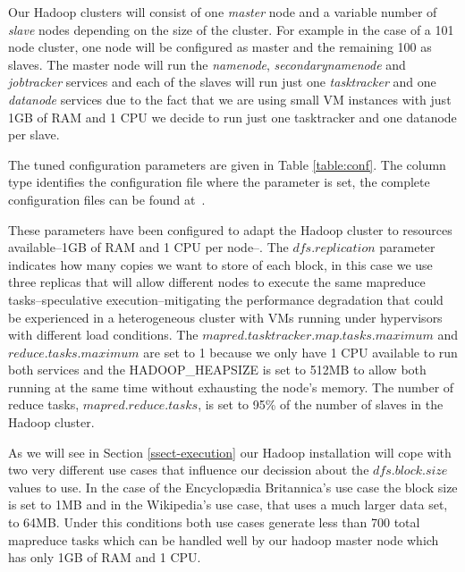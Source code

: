 Our Hadoop clusters will consist of one \emph{master} node and a variable number of \emph{slave} nodes depending on the size of the cluster. For example in the case of a 101 node cluster, one node will be configured as master and the remaining 100 as slaves. The master node will run the \emph{namenode}, \emph{secondarynamenode} and \emph{jobtracker} services and each of the slaves will run just one \emph{tasktracker} and one \emph{datanode} services
due to the fact that we are using small VM instances with just 1GB of RAM and 1 CPU we decide to run just one tasktracker and one datanode per slave. 

 The tuned configuration parameters are given in Table \ref{table:conf}. The column type identifies the configuration file where the parameter is set, the complete configuration files can be found at~\cite{scripts}.

These parameters have been configured to adapt the Hadoop cluster to resources available--1GB of RAM and 1 CPU per node--. The $dfs.replication$ parameter indicates how many copies we want to store of each block, in this case we use three replicas that will allow different nodes to execute the same mapreduce tasks--speculative execution--mitigating the performance degradation that could be experienced in a heterogeneous cluster with VMs running under hypervisors with different load conditions. The $mapred.tasktracker.map.tasks.maximum$ and $reduce.tasks.maximum$ are set to 1 because we only have 1 CPU available to run both services and the HADOOP\_HEAPSIZE is set to 512MB to allow both running at the same time without exhausting the node's memory. The number of reduce tasks, $mapred.reduce.tasks$, is set to 95\% of the number of slaves in the Hadoop cluster. 

As we will see in Section \ref{ssect-execution} our Hadoop installation will cope with two very different use cases that influence our decission about the $dfs.block.size$ values to use. In the case of the Encyclop{\ae}dia Britannica's use case the block size is set to 1MB and in the Wikipedia's use case, that uses a much larger data set, to 64MB. Under this conditions both use cases generate less than 700 total mapreduce tasks which can be handled well by our hadoop master node which has only 1GB of RAM and 1 CPU.


